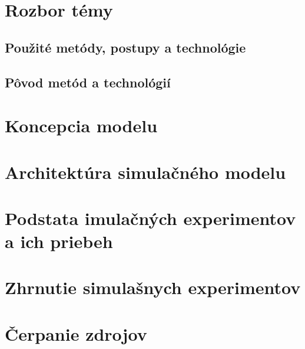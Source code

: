 \documentclass[a4paper, 10pt]{article}
\begin{document}
    \section {Rozbor témy}
        \subsection{Použité metódy, postupy a technológie}

        \subsection{Pôvod metód a technológií}


    \section {Koncepcia modelu}


    \section{Architektúra simulačného modelu}

    \section{Podstata imulačných experimentov a ich priebeh}

    \section{Zhrnutie simulašnych experimentov}

    \section {Čerpanie zdrojov}
        {\cite{example}}

    \newpage
    
    
\end{document}
